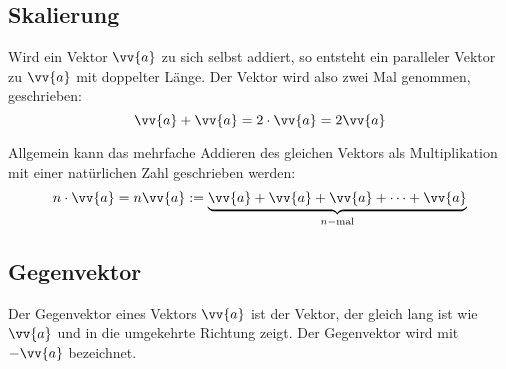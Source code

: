 \subsection{Skalierung}
Wird ein Vektor $\vv{a}$ zu sich selbst addiert, so entsteht ein paralleler Vektor zu $\vv{a}$ mit doppelter Länge. Der Vektor wird also zwei Mal genommen, geschrieben:
\[
  \vv{a} + \vv{a} = 2\cdot\vv{a} = 2\vv{a}
\]
\begin{center}
\end{center}
Allgemein kann das mehrfache Addieren des gleichen Vektors als Multiplikation mit einer natürlichen Zahl geschrieben werden:
\[
  n\cdot\vv{a} = n\vv{a} := \underbrace{\vv{a} + \vv{a} + \vv{a} + \cdots + \vv{a}}_{n-\text{mal}}
\]


\subsection{Gegenvektor}

Der Gegenvektor eines Vektors $\vv{a}$ ist der Vektor, der gleich lang ist wie $\vv{a}$ und in die umgekehrte Richtung zeigt. Der Gegenvektor wird mit $-\vv{a}$ bezeichnet.

\begin{center}
\end{center}




